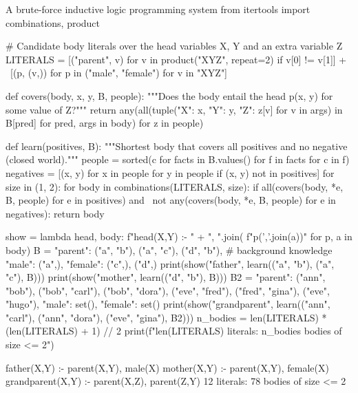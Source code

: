 \begin{pylisting}[label={lst:ilp}]{A brute-force inductive logic programming system}
from itertools import combinations, product

# Candidate body literals over the head variables X, Y and an extra variable Z
LITERALS = [("parent", v) for v in product("XYZ", repeat=2) if v[0] != v[1]] + \
           [(p, (v,)) for p in ("male", "female") for v in "XYZ"]

def covers(body, x, y, B, people):
    """Does the body entail the head p(x, y) for some value of Z?"""
    return any(all(tuple({"X": x, "Y": y, "Z": z}[v] for v in args) in B[pred]
                   for pred, args in body) for z in people)

def learn(positives, B):
    """Shortest body that covers all positives and no negative (closed world)."""
    people = sorted({c for facts in B.values() for f in facts for c in f})
    negatives = [(x, y) for x in people for y in people if (x, y) not in positives]
    for size in (1, 2):
        for body in combinations(LITERALS, size):
            if all(covers(body, *e, B, people) for e in positives) and \
               not any(covers(body, *e, B, people) for e in negatives):
                return body

show = lambda head, body: f"{head}(X,Y) :- " + ", ".join(
    f"{p}({','.join(a)})" for p, a in body)
B = {"parent": {("a", "b"), ("a", "c"), ("d", "b")},              # background knowledge
     "male": {("a",)}, "female": {("c",), ("d",)}}
print(show("father", learn({("a", "b"), ("a", "c")}, B)))
print(show("mother", learn({("d", "b")}, B)))
B2 = {"parent": {("ann", "bob"), ("bob", "carl"), ("bob", "dora"), ("eve", "fred"),
                 ("fred", "gina"), ("eve", "hugo")}, "male": set(), "female": set()}
print(show("grandparent", learn({("ann", "carl"), ("ann", "dora"), ("eve", "gina")}, B2)))
n_bodies = len(LITERALS) * (len(LITERALS) + 1) // 2
print(f"{len(LITERALS)} literals: {n_bodies} bodies of size <= 2")
\end{pylisting}
\begin{pyoutput}
father(X,Y) :- parent(X,Y), male(X)
mother(X,Y) :- parent(X,Y), female(X)
grandparent(X,Y) :- parent(X,Z), parent(Z,Y)
12 literals: 78 bodies of size <= 2
\end{pyoutput}

